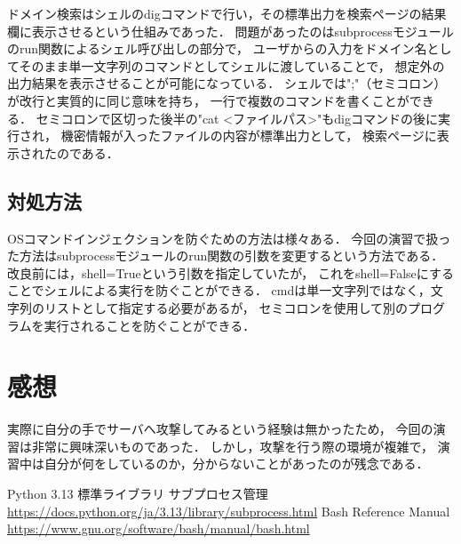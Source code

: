 \documentclass{jlreq}
\begin{document}
ドメイン検索はシェルのdigコマンドで行い，その標準出力を検索ページの結果欄に表示させるという仕組みであった．
問題があったのはsubprocessモジュールのrun関数によるシェル呼び出しの部分で，
ユーザからの入力をドメイン名としてそのまま単一文字列のコマンドとしてシェルに渡していることで，
想定外の出力結果を表示させることが可能になっている．
シェルでは";"（セミコロン）が改行と実質的に同じ意味を持ち，
一行で複数のコマンドを書くことができる．
セミコロンで区切った後半の"cat <ファイルパス>"もdigコマンドの後に実行され，
機密情報が入ったファイルの内容が標準出力として，
検索ページに表示されたのである．

\subsection{対処方法}
OSコマンドインジェクションを防ぐための方法は様々ある．
今回の演習で扱った方法はsubprocessモジュールのrun関数の引数を変更するという方法である．
改良前には，shell=Trueという引数を指定していたが，
これをshell=Falseにすることでシェルによる実行を防ぐことができる．
cmdは単一文字列ではなく，文字列のリストとして指定する必要があるが，
セミコロンを使用して別のプログラムを実行されることを防ぐことができる．

\section{感想}
実際に自分の手でサーバへ攻撃してみるという経験は無かったため，
今回の演習は非常に興味深いものであった．
しかし，攻撃を行う際の環境が複雑で，
演習中は自分が何をしているのか，分からないことがあったのが残念である．


\begin{thebibliography}{99}
     Python 3.13 標準ライブラリ サブプロセス管理 \url{https://docs.python.org/ja/3.13/library/subprocess.html}
     Bash Reference Manual \url{https://www.gnu.org/software/bash/manual/bash.html}
\end{thebibliography}
\end{document}
